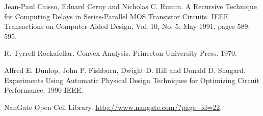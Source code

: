 \documentclass{tfg}
\begin{document}
\begin{thebibliography}{9}
Jean-Paul Caisso, Eduard Cerny and Nicholas C. Rumin. A Recursive Technique for Computing Delays in Series-Parallel MOS Transistor Circuits. IEEE Transactions on Computer-Aided Design, Vol. 10, No. 5, May 1991, pages 589-595.

R. Tyrrell Rockafellar. Convex Analysis. Princeton University Press. 1970.

Alfred E. Dunlop, John P. Fishburn, Dwight D. Hill and Donald D. Shugard. Experiments Using Automatic Physical Design Techniques for Optimizing Circuit Performance. 1990 IEEE.

NanGate Open Cell Library. \url{http://www.nangate.com/?page_id=22}.
\end{thebibliography}

%
\end{document}
